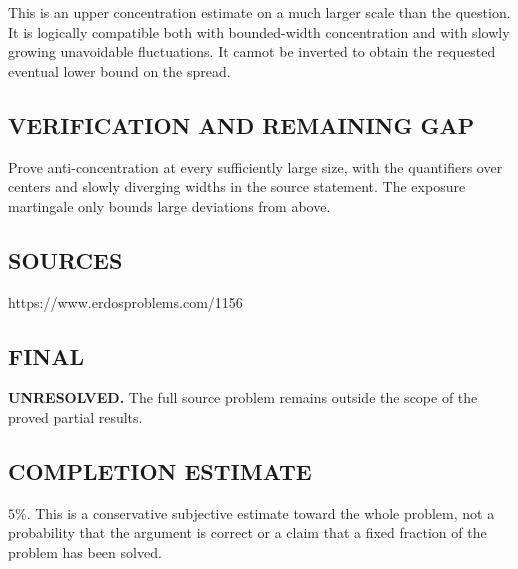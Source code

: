 This is an upper concentration estimate on a much larger scale than the question.
It is logically compatible both with bounded-width concentration and with
slowly growing unavoidable fluctuations. It cannot be inverted to obtain the
requested eventual lower bound on the spread.

\subsection*{VERIFICATION AND REMAINING GAP}
Prove anti-concentration at every sufficiently large size, with the quantifiers
over centers and slowly diverging widths in the source statement. The exposure
martingale only bounds large deviations from above.

\subsection*{SOURCES}
https://www.erdosproblems.com/1156

\subsection*{FINAL}
\textbf{UNRESOLVED.} The full source problem remains outside the scope of the proved partial results.

\subsection*{COMPLETION ESTIMATE}
$5\%$. This is a conservative subjective estimate toward the whole problem, not a probability that the argument is correct or a claim that a fixed fraction of the problem has been solved.
